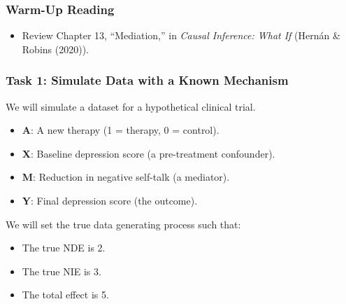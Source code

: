 \documentclass[
  10pt,
  letterpaper,
  DIV=11,
  numbers=noendperiod,
  oneside]{scrartcl}
\providecommand{\tightlist}{%
  \setlength{\itemsep}{0pt}\setlength{\parskip}{0pt}}
\begin{document}
\subsubsection{Warm-Up Reading}\label{warm-up-reading}

\begin{itemize}
\tightlist
\item
  Review Chapter 13, ``Mediation,'' in \emph{Causal Inference: What If}
  (Hernán \& Robins (2020)).
\end{itemize}

\subsubsection{Task 1: Simulate Data with a Known
Mechanism}\label{task-1-simulate-data-with-a-known-mechanism}

We will simulate a dataset for a hypothetical clinical trial.

\begin{itemize}
\tightlist
\item
  \textbf{A}: A new therapy (1 = therapy, 0 = control).
\item
  \textbf{X}: Baseline depression score (a pre-treatment confounder).
\item
  \textbf{M}: Reduction in negative self-talk (a mediator).
\item
  \textbf{Y}: Final depression score (the outcome).
\end{itemize}

We will set the true data generating process such that:

\begin{itemize}
\tightlist
\item
  The true NDE is 2.
\item
  The true NIE is 3.
\item
  The total effect is 5.
\end{itemize}
\end{document}
